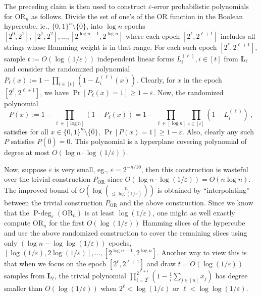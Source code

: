 \documentclass[10pt,a4paper]{article}
\theoremstyle{plain}
\theoremstyle{definition}
\renewcommand{\epsilon}{\varepsilon}
\newcommand{\eps}{\epsilon}
\newcommand{\zo}{\{0,1\}}
\newcommand{\OR}{\mathrm{OR}}
\newcommand{\pdeg}{\operatorname{P-deg}}
\newcommand{\distL}{\mathbf{L}}
\newcommand{\bigo}[1]{O\left(#1\right)}
\begin{document}
The preceding claim is then used to construct $\eps$-error
probabilistic polynomials for $\OR_n$ as follows. Divide the set of one's of the
OR function in the Boolean hypercube, ie., $\zo^n\setminus
\{\bar{0}\}$, into $\log n$ epochs $[2^0,2^1], [2^1,2^2], \ldots, [2^{\log n -1}, 2^{\log n}]$ where
  each epoch $[2^\ell, 2^{\ell +1}]$ includes all strings whose
  Hamming weight is in that range. For each such epoch $[2^\ell,
  2^{\ell+1}]$, sample $t:=O(\log(1/\eps))$ independent linear forms
  $L^{(\ell)}_i, i \in [t]$ from $\distL_\ell$ and consider the randomized
  polynomial $P_\ell(x) := 1 - \prod_{i \in
    [t]}(1-L^{(\ell)}_i(x))$. Clearly, for $x$ in the epoch
  $[2^\ell, 2^{\ell +1}]$, we have $\Pr[P_\ell(x) = 1] \geq 1-
  \eps$. Now, the randomized polynomial 
\[
P(x) := 1- \prod_{\ell \in [\log n]}(1-P_\ell(x)) = 1 - \prod_{\ell
  \in [\log n]}\prod_{i \in [t]} (1- L^{(\ell)}_i)\ ,
\]
satisfies for all $x \in \zo^n\setminus \{\bar{0}\}$, $\Pr[P(x) = 1]
\geq 1-\eps$. Also, clearly any such $P$ satisfies $P(\bar{0}) =
0$. This polynomial is a hyperplane covering polynomial of degree at
most $O(\log n \cdot \log(1/\eps))$.

Now, suppose $\eps$ is very small, eg., $\eps = 2^{-n/10}$, then this construction is wasteful over the trivial construction $P_{\OR}$ since $O(\log n \cdot \log
(1/\eps)) = O(n \log n)$. The improved bound of $\bigo{\log \binom{n}{\leq\log (1/\eps)}}$ 
is obtained by ``interpolating'' between the trivial
construction $P_{\OR}$ and the above construction. Since we know that the $\pdeg_\eps(\OR_n)$ is at least $\log (1/\eps)$, one might as well exactly compute $\OR_n$
for the first $O(\log (1/\eps))$ Hamming slices of the hypercube and use
the above randomized construction to cover the remaining slices using
only $(\log n - \log \log (1/\eps))$ epochs, $[\log(1/\eps),
2\log(1/\eps)], \ldots, [2^{\log n-1}, 2^{\log n}]$. Another way to view this is that when we focus on the epoch $[2^\ell, 2^{\ell+1}]$ and draw $t=O(\log(1/\eps))$ samples from $\distL_\ell$, the trivial polynomial $\prod_{i =2^\ell}^{2^{\ell+1}} \left(1- \frac1i\sum_{j \in [n]} x_j\right)$ has degree smaller than $O(\log(1/\eps))$ when $2^\ell < \log(1/\eps)$ or $\ell < \log\log(1/\eps)$.
\end{document}
